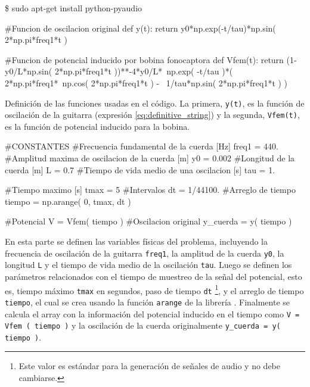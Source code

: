 \begin{listing}[style=consola, numbers=none]
\$ sudo apt-get install python-pyaudio
\end{listing}

\begin{listing}[style=python, numbers = none]
#Funcion de oscilacion original
def y(t):
    return y0*np.exp(-t/tau)*np.sin( 2*np.pi*freq1*t )

#Funcion de potencial inducido por bobina fonocaptora
def Vfem(t):
    return (1-y0/L*np.sin( 2*np.pi*freq1*t ))**-4*y0/L*\
    np.exp( -t/tau )*( 2*np.pi*freq1*\
    np.cos( 2*np.pi*freq1*t ) - \
    1/tau*np.sin( 2*np.pi*freq1*t ) )
\end{listing}
Definición de las funciones usadas en el código. La primera, \texttt{y(t)},
es la función de oscilación de la guitarra (expresión 
\ref{eq:definitive_string}) y la segunda, \texttt{Vfem(t)}, es la función 
de potencial inducido para la bobina.

\begin{listing}[style=python, numbers = none]
#CONSTANTES
#Frecuencia fundamental de la cuerda [Hz]
freq1 = 440.
#Amplitud maxima de oscilacion de la cuerda [m]
y0 = 0.002
#Longitud de la cuerda [m]
L = 0.7
#Tiempo de vida medio de una oscilacion [s]
tau = 1.

#Tiempo maximo [s]
tmax = 5
#Intervalos
dt = 1/44100.
#Arreglo de tiempo 
tiempo = np.arange( 0, tmax, dt )

#Potencial
V = Vfem( tiempo )
#Oscilacion original
y_cuerda = y( tiempo )
\end{listing}
En esta parte se definen las variables físicas del problema, incluyendo la
frecuencia de oscilación de la guitarra \texttt{freq1}, la amplitud de la 
cuerda \texttt{y0}, la longitud \texttt{L} y el tiempo de vida medio de la
oscilación \texttt{tau}. Luego se definen los parámetros relacionados con 
el tiempo de muestreo de la señal del potencial, esto es, tiempo máximo
\texttt{tmax} en segundos, paso de tiempo \texttt{dt} \footnote{Este valor
es estándar para la generación de señales de audio y no debe cambiarse.},
y el arreglo de tiempo \texttt{tiempo}, el cual se crea usando la función
\texttt{arange} de la librería \numpy. Finalmente se calcula el array con
la información del potencial inducido en el tiempo como \texttt{V = Vfem
( tiempo )} y la oscilación de la cuerda originalmente \texttt{y\_cuerda = 
y( tiempo )}.


